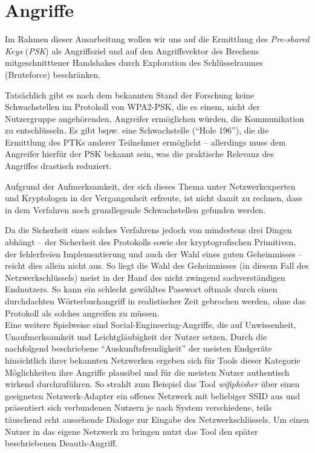 \section{Angriffe}
Im Rahmen dieser Ausarbeitung wollen wir uns auf die Ermittlung des \textit{Pre-shared Keys} (\textit{PSK}) als Angriffsziel und auf den Angriffsvektor des Brechens mitgeschnitttener Handshakes durch Exploration des Schlüsselraumes (Bruteforce) beschränken.

Tatsächlich gibt es nach dem bekannten Stand der Forschung keine Schwachstellen im Protokoll von WPA2-PSK, die es einem, nicht der Nutzergruppe angehörenden, Angreifer ermöglichen würden, die Kommunikation zu entschlüsseln. Es gibt bspw. eine Schwachstelle (\enquote{Hole 196}), die die Ermittlung des PTKs anderer Teilnehmer ermöglicht -- allerdings muss dem Angreifer hierfür der PSK bekannt sein, was die praktische Relevanz des Angriffes drastisch reduziert.

Aufgrund der Aufmerksamkeit, der sich dieses Thema unter Netzwerkexperten und Kryptologen in der Vergangenheit erfreute, ist nicht damit zu rechnen, dass in dem Verfahren noch grundlegende Schwachstellen gefunden werden. 

Da die Sicherheit eines solches Verfahrens jedoch von mindestens drei Dingen abhängt -- der Sicherheit des Protokolls sowie der kryptografischen Primitiven, der fehlerfreien Implementierung und auch der Wahl eines guten Geheimnisses -- reicht dies allein nicht aus. 
So liegt die Wahl des Geheimnisses (in diesem Fall des Netzwerkschlüssels) meist in der Hand des nicht zwingend sachverständigen Endnutzers. 
So kann ein schlecht gewähltes Passwort oftmals durch einen durchdachten Wörterbuchangriff in realistischer Zeit gebrochen werden, ohne das Protokoll als solches angreifen zu müssen.\\

Eine weitere Spielweise sind Social-Engineering-Angriffe, die auf Unwissenheit, Unaufmerksamkeit und Leichtgläubigkeit der Nutzer setzen. 
Durch die nachfolgend beschriebene \enquote{Auskunftsfreudigkeit} der meisten Endgeräte hinsichtlich ihrer bekannten Netzwerken ergeben sich für Tools dieser Kategorie Möglichkeiten ihre Angriffe plausibel und für die meisten Nutzer authentisch wirkend durchzuführen.
So strahlt zum Beispiel das Tool \textit{wifiphisher} über einen geeigneten Netzwerk-Adapter ein offenes Netzwerk mit beliebiger SSID aus und präsentiert sich verbundenen Nutzern je nach System verschiedene, teils täuschend echt aussehende Dialoge zur Eingabe des Netzwerkschlüssels. 
Um einen Nutzer in das eigene Netzwerk zu bringen nutzt das Tool den später beschriebenen Deauth-Angriff. 

